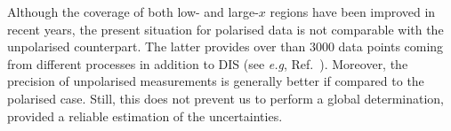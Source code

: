 
Although the coverage of both low- and large-$x$ regions have been improved in recent years, the present situation for polarised data is not comparable with the unpolarised counterpart. The latter provides over than $3000$ data points coming from different processes in addition to DIS (see \textit{e.g}, Ref.~\cite{Kassabov:2022pps}). Moreover, the precision of unpolarised measurements is generally better if compared to the polarised case. Still, this does not prevent us to perform a global determination, provided a reliable estimation of the uncertainties.%

